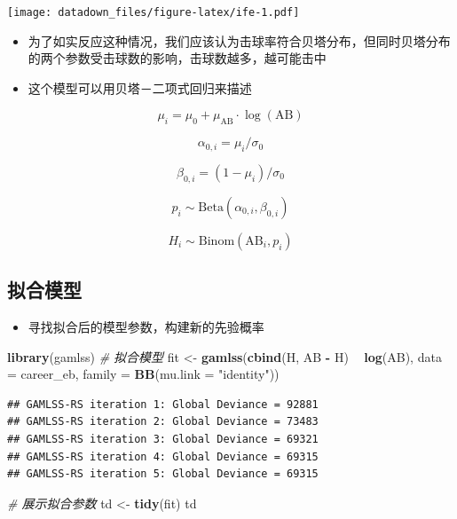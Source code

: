 \documentclass[]{book}
\newenvironment{Shaded}{\begin{snugshade}}{\end{snugshade}}
\newcommand{\CommentTok}[1]{\textcolor[rgb]{0.56,0.35,0.01}{\textit{#1}}}
\newcommand{\DataTypeTok}[1]{\textcolor[rgb]{0.13,0.29,0.53}{#1}}
\newcommand{\KeywordTok}[1]{\textcolor[rgb]{0.13,0.29,0.53}{\textbf{#1}}}
\newcommand{\NormalTok}[1]{#1}
\newcommand{\OperatorTok}[1]{\textcolor[rgb]{0.81,0.36,0.00}{\textbf{#1}}}
\newcommand{\StringTok}[1]{\textcolor[rgb]{0.31,0.60,0.02}{#1}}
\providecommand{\tightlist}{%
  \setlength{\itemsep}{0pt}\setlength{\parskip}{0pt}}
\begin{document}
\texttt{[image: datadown\_files/figure-latex/ife-1.pdf]}

\begin{itemize}
\item
  为了如实反应这种情况，我们应该认为击球率符合贝塔分布，但同时贝塔分布的两个参数受击球数的影响，击球数越多，越可能击中
\item
  这个模型可以用贝塔－二项式回归来描述
\end{itemize}

\[\mu_i = \mu_0 + \mu_{\mbox{AB}} \cdot \log(\mbox{AB})\]

\[\alpha_{0,i} = \mu_i / \sigma_0\]

\[\beta_{0,i} = (1 - \mu_i) / \sigma_0\]

\[p_i \sim \mbox{Beta}(\alpha_{0,i}, \beta_{0,i})\]

\[H_i \sim \mbox{Binom}(\mbox{AB}_i, p_i)\]

\subsection{拟合模型}

\begin{itemize}
\tightlist
\item
  寻找拟合后的模型参数，构建新的先验概率
\end{itemize}

\begin{Shaded}
\begin{Highlighting}[]
\KeywordTok{library}\NormalTok{(gamlss)}
\CommentTok{# 拟合模型}
\NormalTok{fit <-}\StringTok{ }\KeywordTok{gamlss}\NormalTok{(}\KeywordTok{cbind}\NormalTok{(H, AB }\OperatorTok{-}\StringTok{ }\NormalTok{H) }\OperatorTok{~}\StringTok{ }\KeywordTok{log}\NormalTok{(AB),}
              \DataTypeTok{data =}\NormalTok{ career_eb,}
              \DataTypeTok{family =} \KeywordTok{BB}\NormalTok{(}\DataTypeTok{mu.link =} \StringTok{"identity"}\NormalTok{))}
\end{Highlighting}
\end{Shaded}

\begin{verbatim}
## GAMLSS-RS iteration 1: Global Deviance = 92881 
## GAMLSS-RS iteration 2: Global Deviance = 73483 
## GAMLSS-RS iteration 3: Global Deviance = 69321 
## GAMLSS-RS iteration 4: Global Deviance = 69315 
## GAMLSS-RS iteration 5: Global Deviance = 69315
\end{verbatim}

\begin{Shaded}
\begin{Highlighting}[]
\CommentTok{# 展示拟合参数}
\NormalTok{td <-}\StringTok{ }\KeywordTok{tidy}\NormalTok{(fit)}
\NormalTok{td}
\end{Highlighting}
\end{Shaded}
\end{document}
